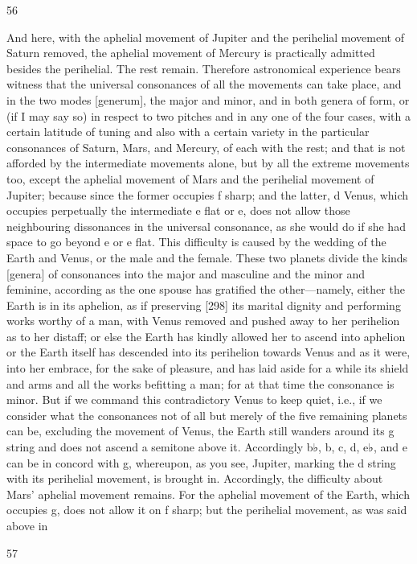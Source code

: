 \documentclass{article}
\begin{document}
56

And here, with the aphelial movement of Jupiter and the perihelial
movement of Saturn removed, the aphelial movement of Mercury is
practically admitted besides the perihelial. The rest remain.
Therefore astronomical experience bears witness that the universal
consonances of all the movements can take place, and in the two modes
[generum], the major and minor, and in both genera of form, or (if I may
say so) in respect to two pitches and in any one of the four cases, with a
certain latitude of tuning and also with a certain variety in the particular
consonances of Saturn, Mars, and Mercury, of each with the rest; and
that is not afforded by the intermediate movements alone, but by all the
extreme movements too, except the aphelial movement of Mars and the
perihelial movement of Jupiter; because since the former
occupies f sharp; and the latter, d Venus, which occupies perpetually the
intermediate e flat or e, does not allow those neighbouring dissonances
in the universal consonance, as she would do if she had space to go
beyond e or e flat. This difficulty is caused by the wedding of the Earth
and Venus, or the male and the female. These two planets divide the
kinds [genera] of consonances into the major and masculine and the
minor and feminine, according as the one spouse has gratified the
other—namely, either the Earth is in its aphelion, as if preserving [298]
its marital dignity and performing works worthy of a man, with Venus
removed and pushed away to her perihelion as to her distaff; or else the
Earth has kindly allowed her to ascend into aphelion or the Earth itself
has descended into its perihelion towards Venus and as it were, into her
embrace, for the sake of pleasure, and has laid aside for a while its shield
and arms and all the works befitting a man; for at that time the
consonance is minor.
But if we command this contradictory Venus to keep quiet, i.e., if we
consider what the consonances not of all but merely of the five remaining
planets can be, excluding the movement of Venus, the Earth still
wanders around its g string and does not ascend a semitone above it.
Accordingly b♭, b, c, d, e♭, and e can be in concord with g, whereupon,
as you see, Jupiter, marking the d string with its perihelial movement, is
brought in. Accordingly, the difficulty about Mars’ aphelial movement
remains. For the aphelial movement of the Earth, which occupies g, does
not allow it on f sharp; but the perihelial movement, as was said above in


57
\end{document}
